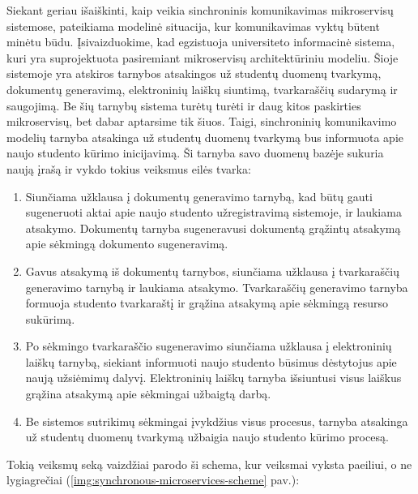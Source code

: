 Siekant geriau išaiškinti, kaip veikia sinchroninis komunikavimas mikroservisų sistemose, pateikiama modelinė situacija, kur komunikavimas vyktų būtent
minėtu būdu. Įsivaizduokime, kad egzistuoja universiteto informacinė sistema, kuri yra suprojektuota pasiremiant mikroservisų
architektūriniu modeliu. Šioje sistemoje yra atskiros tarnybos atsakingos už studentų duomenų tvarkymą, dokumentų generavimą, elektroninių laiškų siuntimą, tvarkaraščių sudarymą 
ir saugojimą. Be šių tarnybų sistema turėtų turėti ir daug kitos paskirties mikroservisų, bet dabar aptarsime tik šiuos.
Taigi, sinchroninių komunikavimo modelių tarnyba atsakinga už studentų duomenų tvarkymą bus informuota apie naujo studento kūrimo inicijavimą.
Ši tarnyba savo duomenų bazėje sukuria naują įrašą ir vykdo tokius veiksmus eilės tvarka:

\begin{enumerate}
  \item Siunčiama užklausa į dokumentų generavimo tarnybą, kad būtų gauti sugeneruoti aktai apie naujo studento užregistravimą sistemoje, ir laukiama atsakymo. Dokumentų tarnyba sugeneravusi dokumentą grąžintų atsakymą apie sėkmingą
  dokumento sugeneravimą.
	\item Gavus atsakymą iš dokumentų tarnybos, siunčiama užklausa į tvarkaraščių generavimo tarnybą ir laukiama atsakymo. Tvarkaraščių generavimo tarnyba formuoja studento tvarkaraštį ir grąžina atsakymą apie sėkmingą resurso sukūrimą.
	\item Po sėkmingo tvarkaraščio sugeneravimo siunčiama užklausa į elektroninių laiškų tarnybą, siekiant informuoti naujo studento būsimus dėstytojus apie
  naują užsiėmimų dalyvį. Elektroninių laiškų tarnyba išsiuntusi visus laiškus grąžina atsakymą apie sėkmingai užbaigtą darbą.
  \item Be sistemos sutrikimų sėkmingai įvykdžius visus procesus, tarnyba atsakinga už studentų duomenų tvarkymą užbaigia naujo studento kūrimo procesą.
\end{enumerate}

Tokią veiksmų seką vaizdžiai parodo ši schema, kur veiksmai vyksta paeiliui, o ne lygiagrečiai (\ref{img:synchronous-microservices-scheme} pav.):

